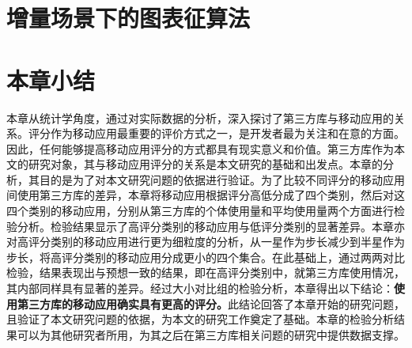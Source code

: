 \section{增量场景下的图表征算法}

\section{本章小结}
本章从统计学角度，通过对实际数据的分析，深入探讨了第三方库与移动应用的关系。评分作为移动应用最重要的评价方式之一，是开发者最为关注和在意的方面。因此，任何能够提高移动应用评分的方式都具有现实意义和价值。第三方库作为本文的研究对象，其与移动应用评分的关系是本文研究的基础和出发点。本章的分析，其目的是为了对本文研究问题的依据进行验证。为了比较不同评分的移动应用间使用第三方库的差异，本章将移动应用根据评分高低分成了四个类别，然后对这四个类别的移动应用，分别从第三方库的个体使用量和平均使用量两个方面进行检验分析。检验结果显示了高评分类别的移动应用与低评分类别的显著差异。本章亦对高评分类别的移动应用进行更为细粒度的分析，从一星作为步长减少到半星作为步长，将高评分类别的移动应用分成更小的四个集合。在此基础上，通过两两对比检验，结果表现出与预想一致的结果，即在高评分类别中，就第三方库使用情况，其内部同样具有显著的差异。经过大小对比组的检验分析，本章得出以下结论：\textbf{使用第三方库的移动应用确实具有更高的评分。}此结论回答了本章开始的研究问题，且验证了本文研究问题的依据，为本文的研究工作奠定了基础。本章的检验分析结果可以为其他研究者所用，为其之后在第三方库相关问题的研究中提供数据支撑。